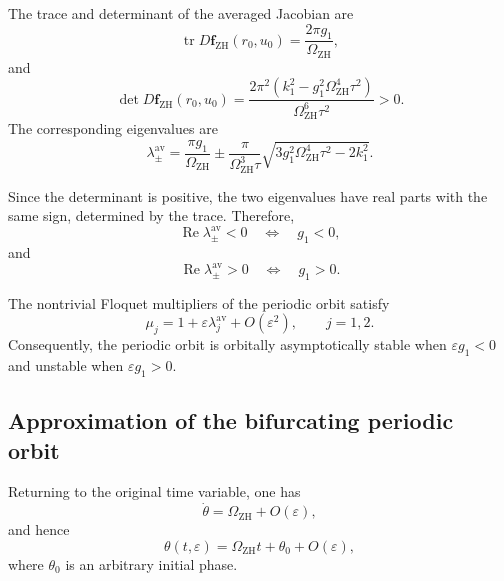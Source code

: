 \documentclass[11pt,reqno]{amsart}
\theoremstyle{plain}
\theoremstyle{definition}
\theoremstyle{remark}
\begin{document}
The trace and determinant of the averaged Jacobian are
\begin{equation}
\label{eq:zero-Hopf-trace-determinant}
\operatorname{tr}
D\mathbf f_{\mathrm{ZH}}(r_0,u_0)
=
\frac{
2\pi g_1
}{
\Omega_{\mathrm{ZH}}
},
\end{equation}
and
\begin{equation}
\label{eq:zero-Hopf-determinant-repeated}
\det
D\mathbf f_{\mathrm{ZH}}(r_0,u_0)
=
\frac{
2\pi^2
\left(
k_1^2
-
g_1^2\Omega_{\mathrm{ZH}}^4\tau^2
\right)
}{
\Omega_{\mathrm{ZH}}^6\tau^2
}
>0.
\end{equation}
The corresponding eigenvalues are
\begin{equation}
\label{eq:zero-Hopf-averaged-eigenvalues}
\lambda_\pm^{\mathrm{av}}
=
\frac{
\pi g_1
}{
\Omega_{\mathrm{ZH}}
}
\pm
\frac{\pi}
{\Omega_{\mathrm{ZH}}^3\tau}
\sqrt{
3g_1^2
\Omega_{\mathrm{ZH}}^4\tau^2
-
2k_1^2
}.
\end{equation}

Since the determinant is positive, the two eigenvalues have real parts
with the same sign, determined by the trace. Therefore,
\[
\operatorname{Re}
\lambda_\pm^{\mathrm{av}}<0
\quad\Longleftrightarrow\quad
g_1<0,
\]
and
\[
\operatorname{Re}
\lambda_\pm^{\mathrm{av}}>0
\quad\Longleftrightarrow\quad
g_1>0.
\]

The nontrivial Floquet multipliers of the periodic orbit satisfy
\begin{equation}
\label{eq:zero-Hopf-Floquet-expansion}
\mu_j
=
1+
\varepsilon
\lambda_j^{\mathrm{av}}
+
O(\varepsilon^2),
\qquad
j=1,2.
\end{equation}
Consequently, the periodic orbit is orbitally asymptotically stable when
$
\varepsilon g_1<0
$
and unstable when
$
\varepsilon g_1>0.
$

\subsection{Approximation of the bifurcating periodic orbit}
\label{subsec:zero-Hopf-orbit-approximation}

Returning to the original time variable, one has
\[
\dot\theta
=
\Omega_{\mathrm{ZH}}
+
O(\varepsilon),
\]
and hence
\begin{equation}
\label{eq:zero-Hopf-theta-time}
\theta(t,\varepsilon)
=
\Omega_{\mathrm{ZH}}t+\theta_0
+
O(\varepsilon),
\end{equation}
where \(\theta_0\) is an arbitrary initial phase.
\end{document}
